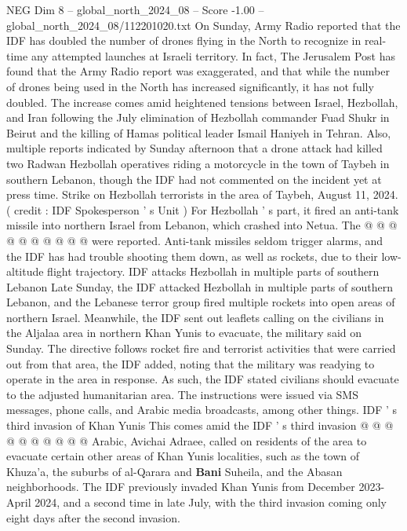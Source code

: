 \begin{textsample}{NEG Dim 8 – global\_north\_2024\_08 – Score -1.00 – global\_north\_2024\_08/112201020.txt}  \label{ex:f8_neg_420}
On Sunday, Army Radio reported that the IDF has doubled the number of drones flying in the North to recognize in real-time any attempted launches at Israeli territory.
In fact, The Jerusalem Post has found that the Army Radio report was exaggerated, and that while the number of drones being used in the North has increased significantly, it has not fully doubled.
The increase comes amid heightened tensions between Israel, Hezbollah, and Iran following the July elimination of Hezbollah commander Fuad Shukr in Beirut and the killing of Hamas political leader Ismail Haniyeh in Tehran.
Also, multiple reports indicated by Sunday afternoon that a drone attack had killed two Radwan Hezbollah operatives riding a motorcycle in the town of Taybeh in southern Lebanon, though the IDF had not commented on the incident yet at press time.
Strike on Hezbollah terrorists in the area of Taybeh, August 11, 2024. ( credit : IDF Spokesperson ' s Unit ) For Hezbollah ' s part, it fired an anti-tank missile into northern Israel from Lebanon, which crashed into Netua.
The @ @ @ @ @ @ @ @ @ @ were reported.
Anti-tank missiles seldom trigger alarms, and the IDF has had trouble shooting them down, as well as rockets, due to their low-altitude flight trajectory.
IDF attacks Hezbollah in multiple parts of southern Lebanon Late Sunday, the IDF attacked Hezbollah in multiple parts of southern Lebanon, and the Lebanese terror group fired multiple rockets into open areas of northern Israel.
Meanwhile, the IDF sent out leaflets calling on the civilians in the Aljalaa area in northern Khan Yunis to evacuate, the military said on Sunday.
The directive follows rocket fire and terrorist activities that were carried out from that area, the IDF added, noting that the military was readying to operate in the area in response.
As such, the IDF stated civilians should evacuate to the adjusted humanitarian area.
The instructions were issued via SMS messages, phone calls, and Arabic media broadcasts, among other things.
IDF ' s third invasion of Khan Yunis This comes amid the IDF ' s third invasion @ @ @ @ @ @ @ @ @ @ Arabic, Avichai Adraee, called on residents of the area to evacuate certain other areas of Khan Yunis localities, such as the town of Khuza'a, the suburbs of al-Qarara and \textbf{Bani} Suheila, and the Abasan neighborhoods.
The IDF previously invaded Khan Yunis from December 2023-April 2024, and a second time in late July, with the third invasion coming only eight days after the second invasion.

\end{textsample}

